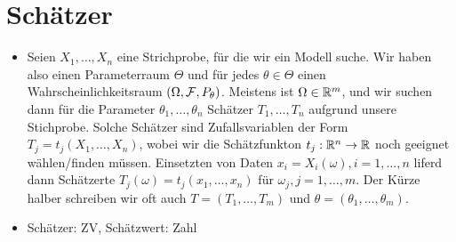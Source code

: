 
\section{Schätzer}
\begin{itemize}
    \item Seien $X_1, \dots, X_n$ eine Strichprobe, für die wir ein Modell suche. Wir haben also einen Parameterraum $\Theta$ und für jedes $\theta \in \Theta$ einen Wahrscheinlichkeitsraum $(\Omega, \mathcal{F}, P_\theta)$. Meistens ist $\Omega \in \mathbb{R}^m$, und wir suchen dann für die Parameter $\theta_1, \dots, \theta_n$ Schätzer $T_1, \dots, T_n$ aufgrund unsere Stichprobe. Solche Schätzer sind Zufallsvariablen der Form $T_j = t_j(X_1, \dots, X_n)$, wobei wir die Schätzfunkton $t_j: \mathbb{R}^n \to \mathbb{R}$ noch geeignet wählen/finden müssen. Einsetzten von Daten $x_i = X_i(\omega), i = 1, \dots, n$ liferd dann Schätzerte $T_j(\omega) = t_j(x_1, \dots, x_n)$ für $\omega_j, j = 1, \dots, m$. Der Kürze halber schreiben wir oft auch $T = (T_1, \dots, T_m)$ und $\theta = (\theta_1, \dots, \theta_m)$.
    \item Schätzer: ZV, Schätzwert: Zahl
\end{itemize}
